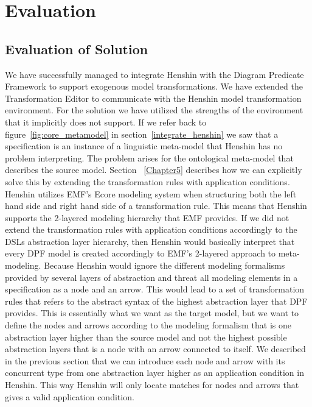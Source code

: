 
\chapter{Evaluation} %

\label{Chapter6} %



\section{Evaluation of Solution}
\label{evaluate_solution}
We have successfully managed to integrate Henshin with the Diagram Predicate
Framework to support exogenous model transformations. We have extended the
Transformation Editor to communicate with the Henshin model transformation
environment. For the solution we have utilized the strengths of the environment
that it implicitly does not support. If we refer back to
figure~\ref{fig:core_metamodel} in section~\ref{integrate_henshin} we saw that
a specification is an instance of a linguistic meta-model that Henshin has no
problem interpreting. The problem arises for the ontological meta-model that
describes the source model. Section ~\ref{Chapter5} describes how we can
explicitly solve this by extending the transformation rules with application
conditions. Henshin utilizes EMF's Ecore modeling system when structuring both
the left hand side and right hand side of a transformation rule. This means
that Henshin supports the 2-layered modeling hierarchy that EMF provides. If we
did not extend the transformation rules with application conditions accordingly
to the DSLs abstraction layer hierarchy, then Henshin would basically interpret
that every DPF model is created accordingly to EMF's 2-layered approach to
meta-modeling. Because Henshin would ignore the different modeling formalisms
provided by several layers of abstraction and threat all modeling elements in a
specification as a node and an arrow. This would lead to a set of transformation
rules that refers to the abstract syntax of the highest abstraction layer that
DPF provides. This is essentially what we want as the target model, but we want
to define the nodes and arrows according to the modeling formalism that is one
abstraction layer higher than the source model and not the highest possible
abstraction layers that is a node with an arrow connected to itself. We
described in the previous section that we can introduce each node and arrow
with its concurrent type from one abstraction layer higher as an application
condition in Henshin. This way Henshin will only locate matches for nodes and
arrows that gives a valid application condition. 


